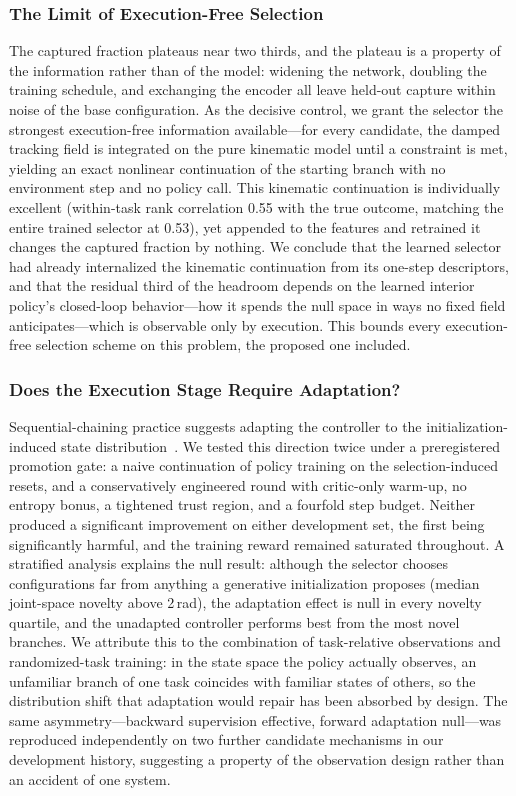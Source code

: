 \documentclass[journal]{IEEEtran}
\begin{document}
\subsubsection{The Limit of Execution-Free Selection}
\label{sec:abl-limit}
The captured fraction plateaus near two thirds, and the plateau is a
property of the information rather than of the model: widening the
network, doubling the training schedule, and exchanging the encoder all
leave held-out capture within noise of the base configuration. As the
decisive control, we grant the selector the strongest execution-free
information available---for every candidate, the damped tracking field
is integrated on the pure kinematic model until a constraint is met,
yielding an exact nonlinear continuation of the starting branch with no
environment step and no policy call. This kinematic continuation is
individually excellent (within-task rank correlation 0.55 with the true
outcome, matching the entire trained selector at 0.53), yet appended to
the features and retrained it changes the captured fraction by nothing.
We conclude that the learned selector had already internalized the
kinematic continuation from its one-step descriptors, and that the
residual third of the headroom depends on the learned interior policy's
closed-loop behavior---how it spends the null space in ways no fixed
field anticipates---which is observable only by execution. This bounds
every execution-free selection scheme on this problem, the proposed one
included.

\subsubsection{Does the Execution Stage Require Adaptation?}
\label{sec:abl-fwd}
Sequential-chaining practice suggests adapting the controller to the
initialization-induced state
distribution~\cite{chen2023sequential}. We tested this direction twice
under a preregistered promotion gate: a naive continuation of policy
training on the selection-induced resets, and a conservatively
engineered round with critic-only warm-up, no entropy bonus, a tightened
trust region, and a fourfold step budget. Neither produced a significant
improvement on either development set, the first being significantly
harmful, and the training reward remained saturated throughout. A
stratified analysis explains the null result: although the selector
chooses configurations far from anything a generative initialization
proposes (median joint-space novelty above 2\,rad), the adaptation
effect is null in every novelty quartile, and the unadapted controller
performs best from the most novel branches. We attribute this to the
combination of task-relative observations and randomized-task training:
in the state space the policy actually observes, an unfamiliar branch of
one task coincides with familiar states of others, so the distribution
shift that adaptation would repair has been absorbed by design. The same
asymmetry---backward supervision effective, forward adaptation
null---was reproduced independently on two further candidate mechanisms
in our development history, suggesting a property of the observation
design rather than an accident of one system.
\end{document}
